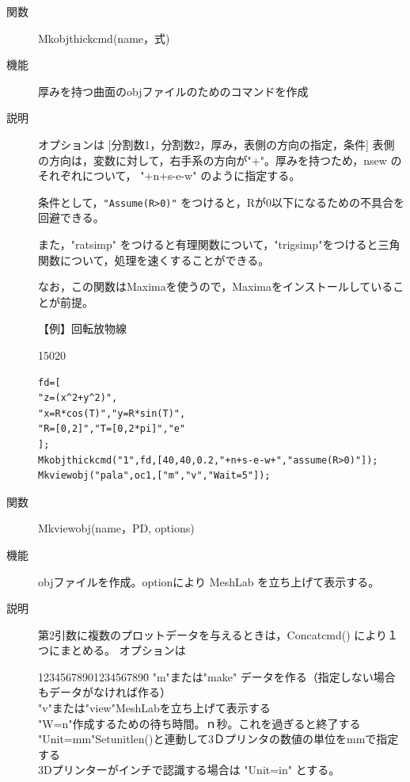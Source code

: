 \documentclass[papersize,a4paper,12pt,uplatex]{jsarticle}
\begin{document}
\begin{description}
\vspace{\baselineskip}
\hypertarget{mkobjthickcmd}{}
\item[関数]Mkobjthickcmd(name，式)
\item[機能]厚みを持つ曲面のobjファイルのためのコマンドを作成
\item[説明]オプションは [分割数1，分割数2，厚み，表側の方向の指定，条件]
表側の方向は，変数に対して，右手系の方向が"+"。厚みを持つため，nsew のそれぞれについて，
"+n+s-e-w" のように指定する。

条件として，\verb|"Assume(R>0)"| をつけると，Rが0以下になるための不具合を回避できる。

また，"ratsimp" をつけると有理関数について，"trigsimp"をつけると三角関数について，処理を速くすることができる。

なお，この関数はMaximaを使うので，Maximaをインストールしていることが前提。

\vspace{\baselineskip}
【例】回転放物線

\begin{layer}{150}{20}
\end{layer}
\begin{verbatim}
fd=[
"z=(x^2+y^2)",
"x=R*cos(T)","y=R*sin(T)",
"R=[0,2]","T=[0,2*pi]","e"
];
Mkobjthickcmd("1",fd,[40,40,0.2,"+n+s-e-w+","assume(R>0)"]);
Mkviewobj("pala",oc1,["m","v","Wait=5"]); 
\end{verbatim}


\vspace{37mm}
\hypertarget{mkviewobj}{}
\item[関数]Mkviewobj(name，PD, options)
\item[機能]objファイルを作成。optionにより MeshLab を立ち上げて表示する。
\item[説明]第2引数に複数のプロットデータを与えるときは，Concatcmd() により１つにまとめる。
オプションは 
\begin{tabbing}
12345678901234567890\=\kill
"m"または"make"\> データを作る（指定しない場合もデータがなければ作る）\\
"v"または"view"\>MeshLabを立ち上げて表示する\\
"W=n"\>作成するための待ち時間。ｎ秒。これを過ぎると終了する\\
"Unit=mm"\>Setunitlen()と連動して3Ｄプリンタの数値の単位をmmで指定する\\
\>3Dプリンターがインチで認識する場合は "Unit=in" とする。\\
\end{tabbing}


\end{description}
\end{document}

